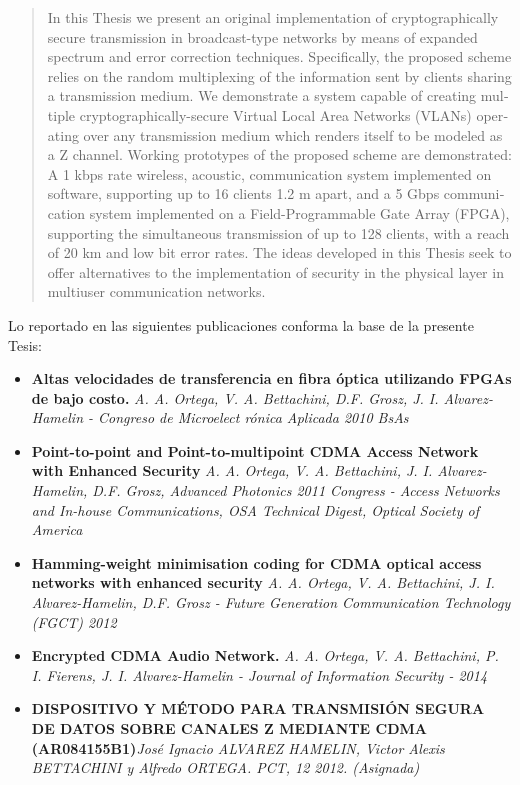 \documentclass[12pt,twoside,openright]{moddalthesis}
\begin{document}
\begin{otherlanguage}{english} 
\begin{abstract}
In this Thesis we present an original implementation of cryptographically secure transmission in broadcast-type networks by means of expanded spectrum and error correction techniques. Specifically, the proposed scheme relies on the random multiplexing of the information sent by clients sharing a transmission medium. 
We demonstrate a system capable of creating multiple cryptographically-secure Virtual Local Area Networks (VLANs) operating over any transmission medium which renders itself to be modeled as a Z channel.
Working prototypes of the proposed scheme are demonstrated: A 1 kbps rate wireless, acoustic, communication system implemented on software, supporting up to 16 clients 1.2 m apart, and a 5 Gbps communication system implemented on a Field-Programmable Gate Array (FPGA), supporting the simultaneous transmission of up to 128 clients, with a reach of 20 km and low bit error rates. 
The ideas developed in this Thesis seek to offer alternatives to the implementation of security in the physical layer in multiuser communication networks.   
\end{abstract}
\end{otherlanguage}




\begin{listofpubs}
Lo reportado en las siguientes publicaciones conforma la base de la presente Tesis:

\begin{itemize}
\item \textbf{Altas velocidades de transferencia en fibra óptica utilizando FPGAs de bajo costo. } \textit{A. A. Ortega, V. A. Bettachini, D.F. Grosz, J. I. Alvarez-Hamelin - Congreso de Microelect
rónica Aplicada 2010 BsAs}
\item \textbf{ Point-to-point and Point-to-multipoint CDMA Access Network with Enhanced Security} \textit{ A. A. Ortega, V. A. Bettachini, J. I. Alvarez-Hamelin, D.F. Grosz, Advanced Photonics 2011 Congress - Access Networks and In-house Communications, OSA Technical Digest, Optical Society of America}
\item \textbf{Hamming-weight minimisation coding for CDMA optical access networks with enhanced security} \textit{ A. A. Ortega, V. A. Bettachini, J. I. Alvarez-Hamelin, D.F. Grosz - Future Generation Communication Technology (FGCT) 2012}
\item \textbf{Encrypted CDMA Audio Network.} \textit{ A. A. Ortega, V. A. Bettachini, P. I. Fierens, J. I. Alvarez-Hamelin -  Journal of Information Security - 2014}
\item \textbf{DISPOSITIVO Y MÉTODO PARA TRANSMISIÓN SEGURA DE DATOS SOBRE CANALES Z MEDIANTE CDMA (AR084155B1)}\textit{José Ignacio ALVAREZ HAMELIN, Victor Alexis BETTACHINI y  Alfredo ORTEGA. PCT, 12 2012. (Asignada)}
\end{itemize}
\end{listofpubs}
\end{document}
